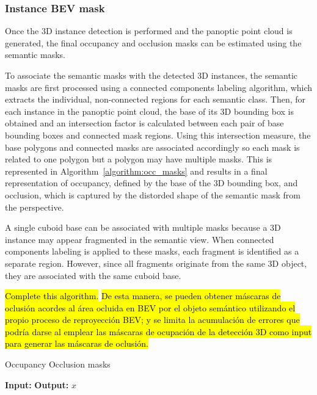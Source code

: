 \subsubsection{Instance BEV mask} \label{sec:instance_bev_mask_methodology}
Once the 3D instance detection is performed and the panoptic point cloud is generated, the final occupancy and occlusion masks can be estimated using the semantic  masks.

To associate the  semantic masks with the detected 3D instances, the semantic masks are first processed using a connected components labeling algorithm, which extracts the individual, non-connected regions for each semantic class. Then, for each instance in the panoptic point cloud, the base of its 3D bounding box is obtained and an intersection factor is calculated between each pair of base bounding boxes and connected mask regions. Using this intersection measure, the base polygons and connected masks are associated accordingly so each mask is related to one polygon but a polygon may have multiple masks. This is represented in Algorithm~\ref{algorithm:occ_masks} and results in a final representation of occupancy, defined by the base of the 3D bounding box, and occlusion, which is captured by the distorded shape of the semantic mask from the  perspective.

A single cuboid base can be associated with multiple  masks because a 3D instance may appear fragmented in the  semantic view. When connected components labeling is applied to these masks, each fragment is identified as a separate region. However, since all fragments originate from the same 3D object, they are associated with the same cuboid base.

\hl{Complete this algorithm.}
\hl{De esta manera, se pueden obtener máscaras de oclusión acordes al área ocluida en BEV por el objeto semántico utilizando el propio proceso de reproyección BEV; y se limita la acumulación de errores que podría darse al emplear las máscaras de ocupación de la detección 3D como input para generar las máscaras de oclusión.}

\begin{algorithm}
    \caption{Occupancy Occlusion masks}
    \label{algorithm:occ_masks}
    \footnotesize

    \begin{algorithmic}[1]
        \State \textbf{Input:} 
        \State \textbf{Output:} 
        \State \Return $x$
    \end{algorithmic}
\end{algorithm}

